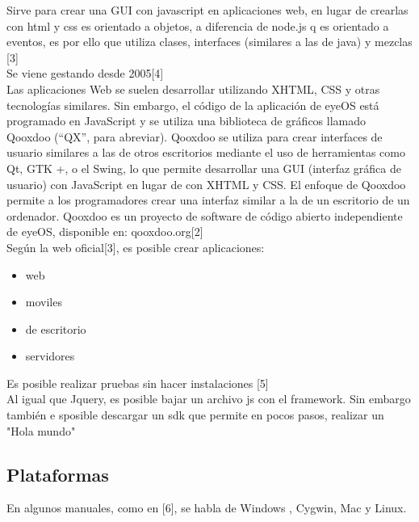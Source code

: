 
Sirve para crear una GUI con javascript en aplicaciones web, en lugar de crearlas con html y css es orientado a objetos, 
a diferencia de node.js q es orientado a eventos, es por ello que utiliza clases, interfaces (similares a las de java) y mezclas [3]\\

Se viene gestando desde 2005[4]\\

Las aplicaciones Web se suelen desarrollar utilizando XHTML, CSS y otras tecnologías similares. Sin embargo, 
el código de la aplicación de eyeOS está programado en JavaScript y se utiliza una biblioteca de gráficos llamado 
Qooxdoo (“QX”, para abreviar). Qooxdoo se utiliza para crear interfaces de usuario similares a las de otros escritorios
mediante el uso de herramientas como Qt, GTK +, o el Swing, lo que permite desarrollar una GUI (interfaz gráfica 
de usuario) con JavaScript en lugar de con XHTML y CSS. El enfoque de Qooxdoo permite a los programadores crear una 
interfaz similar a la de un escritorio de un ordenador. Qooxdoo es un proyecto de software de código abierto independiente 
de eyeOS, disponible en: qooxdoo.org[2]\\

Según la web oficial[3], es posible crear aplicaciones:
\begin{itemize}
 \item web
 \item moviles
 \item de escritorio 
 \item servidores
\end{itemize}

Es posible realizar pruebas sin hacer instalaciones [5]\\

Al igual que Jquery, es posible bajar un archivo js con el framework. Sin embargo también e sposible descargar un sdk que permite en pocos
pasos, realizar un "Hola mundo"

\subsection{Plataformas}

En algunos manuales, como en [6], se habla de Windows , Cygwin, Mac y Linux.\\




